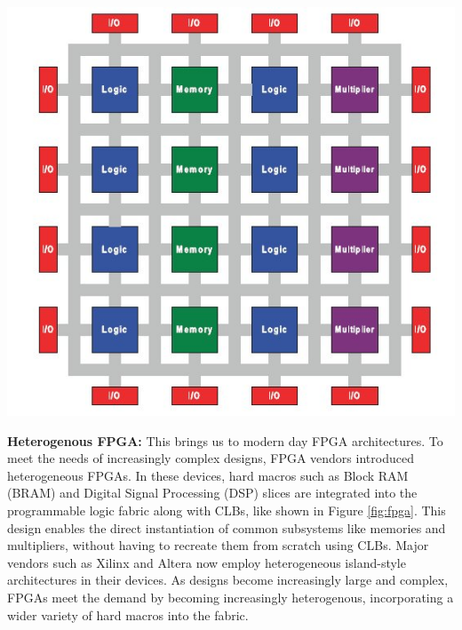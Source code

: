 {
    \centering
    \includegraphics[width=\columnwidth]{figures/heterogenous_fpga_3.jpg}
    \label{fig:fpga}
}
\vspace{0.5cm}

\textbf{Heterogenous FPGA:} \quad 
This brings us to modern day FPGA architectures. 
To meet the needs of increasingly complex designs, FPGA vendors introduced heterogeneous FPGAs. 
In these devices, hard macros such as Block RAM (BRAM) and Digital Signal Processing (DSP) slices are integrated into the programmable logic fabric along with CLBs, like shown in Figure \ref{fig:fpga}. 
This design enables the direct instantiation of common subsystems like memories and multipliers, without having to recreate them from scratch using CLBs. 
Major vendors such as Xilinx and Altera now employ heterogeneous island-style architectures in their devices. 
As designs become increasingly large and complex, FPGAs meet the demand by becoming increasingly heterogenous, incorporating a wider variety of hard macros into the fabric. 

